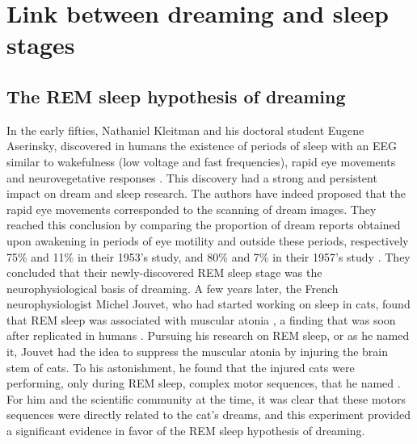 %

\section{Link between dreaming and sleep stages}
\label{sec:dream-research:link}

\subsection{The REM sleep hypothesis of dreaming}
\label{sec:dream-research:link:rem-sleep}

In the early fifties, Nathaniel Kleitman and his doctoral student Eugene Aserinsky, discovered in humans the existence of periods of sleep with an EEG similar to wakefulness (low voltage and fast frequencies), rapid eye movements and neurovegetative responses \citep{aserinsky_regularly_1953}. This discovery had a strong and persistent impact on dream and sleep research. The authors have indeed proposed that the rapid eye movements corresponded to the scanning of dream images. They reached this conclusion by comparing the proportion of dream reports obtained upon awakening in periods of eye motility and outside these periods, respectively 75\% and 11\% in their 1953’s study, and 80\% and 7\% in their 1957's study \citep{dement_relation_1957}. They concluded that their newly-discovered REM sleep stage was the neurophysiological basis of dreaming. A few years later, the French neurophysiologist Michel Jouvet, who had started working on sleep in cats, found that REM sleep was associated with muscular atonia \citep{jouvet_sur_1959}, a finding that was soon after replicated in humans \citep{berger_tonus_1961}. Pursuing his research on REM sleep, or  as he named it, Jouvet had the idea to suppress the muscular atonia by injuring the brain stem of cats. To his astonishment, he found that the injured cats were performing, only during REM sleep, complex motor sequences, that he named  \citep{sastre_comportement_1979}. For him and the scientific community at the time, it was clear that these motors sequences were directly related to the cat's dreams, and this experiment provided a significant evidence in favor of the REM sleep hypothesis of dreaming.

